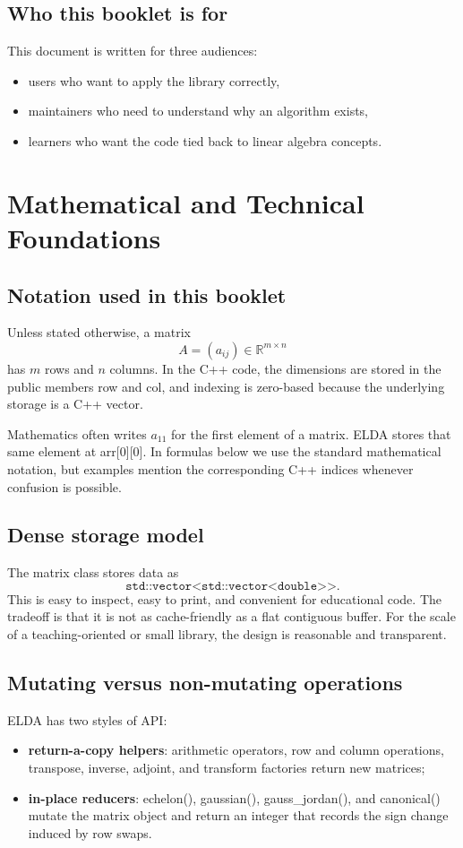 \documentclass[11pt,a4paper,openany]{book}
\def\code#1{#1}%
\def\ELDA{ELDA}%
\newcommand{\ELDA}{\textsc{ELDA}}
\DeclareRobustCommand{\code}[1]{\texttt{\detokenize{#1}}}
\newcommand{\R}{\mathbb{R}}
\begin{document}
\section{Who this booklet is for}
This document is written for three audiences:
\begin{itemize}
    \item users who want to apply the library correctly,
    \item maintainers who need to understand why an algorithm exists,
    \item learners who want the code tied back to linear algebra concepts.
\end{itemize}

\chapter{Mathematical and Technical Foundations}

\section{Notation used in this booklet}
Unless stated otherwise, a matrix
\[
A = (a_{ij}) \in \R^{m \times n}
\]
has \(m\) rows and \(n\) columns. In the C++ code, the dimensions are stored in the public members \code{row} and \code{col}, and indexing is zero-based because the underlying storage is a C++ vector.

\begin{mathbox}
Mathematics often writes \(a_{11}\) for the first element of a matrix. ELDA stores that same element at \code{arr[0][0]}. In formulas below we use the standard mathematical notation, but examples mention the corresponding C++ indices whenever confusion is possible.
\end{mathbox}

\section{Dense storage model}
The matrix class stores data as
\[
\texttt{std::vector<std::vector<double>>}.
\]
This is easy to inspect, easy to print, and convenient for educational code. The tradeoff is that it is not as cache-friendly as a flat contiguous buffer. For the scale of a teaching-oriented or small library, the design is reasonable and transparent.

\section{Mutating versus non-mutating operations}
\ELDA{} has two styles of API:
\begin{itemize}
    \item \textbf{return-a-copy helpers}: arithmetic operators, row and column operations, transpose, inverse, adjoint, and transform factories return new matrices;
    \item \textbf{in-place reducers}: \code{echelon()}, \code{gaussian()}, \code{gauss_jordan()}, and \code{canonical()} mutate the matrix object and return an integer that records the sign change induced by row swaps.
\end{itemize}
\end{document}
